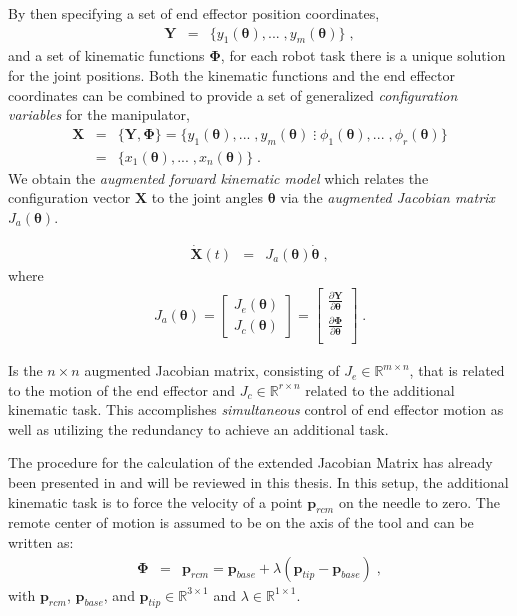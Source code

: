 By then specifying a set of end effector position coordinates,\begin{eqnarray}
	\bm{Y} &=& \{y_1(\bm{\theta}),...\; ,y_m(\bm{\theta})\} \; ,
\end{eqnarray}
and a set of kinematic functions $\bm{\Phi}$, for each robot task there is a unique solution for the joint positions. Both the kinematic functions and the end effector coordinates can be combined to provide a set of generalized \textit{configuration variables} for the manipulator,
\begin{eqnarray}
	\bm{X} &=& \{\bm{Y},\bm{\Phi} \} = \{y_1(\bm{\theta}),...\; ,y_m(\bm{\theta}) \; \vdots  \;\phi_1(\bm{\theta}),...\; ,\phi_r(\bm{\theta})\} \\
	&=& \{x_1(\bm{\theta}),...\; ,x_n(\bm{\theta})\} \; .
\end{eqnarray}
We obtain the \textit{augmented forward kinematic model} which relates the configuration vector $\bm{X}$ to the joint angles $\bm{\theta}$ via the \textit{augmented Jacobian matrix} $J_a(\bm{\theta})$. 

\begin{eqnarray}
	\bm{\dot{X}}(t) &=& J_a(\bm{\theta}) \dot{\bm{\theta}} \; ,
\end{eqnarray}
where 
\begin{eqnarray}
	J_a(\bm{\theta})=
		\begin{bmatrix}
			J_e(\bm{\theta})\\[3pt]
			J_c(\bm{\theta})
		\end{bmatrix}	
				=
		\begin{bmatrix}
			\frac{\partial \bm{Y}}{\partial \bm{\theta}}\\[3pt]
			\frac{\partial \bm{\Phi}}{\partial \bm{\theta}}\\
		\end{bmatrix} \; .
\end{eqnarray}
					
Is the $n \times n$  augmented Jacobian matrix, consisting of $J_e \in  \mathbb{R}^{m\times n}$, that is related to the motion of the end effector and $J_c \in  \mathbb{R}^{r\times n}$ related to the additional kinematic task.			
This accomplishes \textit{simultaneous} control of end effector motion as well as utilizing the redundancy to achieve an additional task.

The procedure for the calculation of the extended Jacobian Matrix has already been presented in \cite{AliRCM} and will be reviewed in this thesis.   
In this setup, the additional kinematic task is to force the velocity of a point $\bm{p}_{rcm}$ on the needle to zero.
The remote center of motion is assumed to be on the axis of the tool and can be written as:
\begin{eqnarray}
	\bm{\Phi} &=& \bm{p}_{rcm} = \bm{p}_{base}+\lambda(\bm{p}_{tip}-\bm{p}_{base}) \; ,
\end{eqnarray}
with $\bm{p}_{rcm}$, $\bm{p}_{base}$, and $\bm{p}_{tip} \in \mathbb{R}^{3\times1}$ and $\lambda \in \mathbb{R}^{1\times1}$. 

